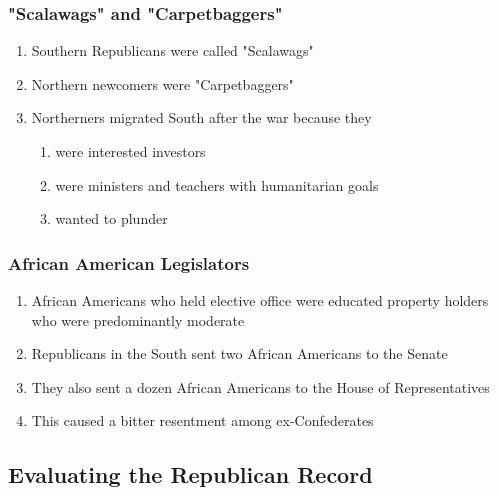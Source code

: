 \documentclass[12pt]{article} %
\begin{document}
\subsubsection{"Scalawags" and "Carpetbaggers"}
\begin{enumerate}
	\item Southern Republicans were called "Scalawags"
	\item Northern newcomers were "Carpetbaggers"
	\item Northerners migrated South after the war because they
	\begin{enumerate}
		\item were interested investors
		\item were ministers and teachers with humanitarian goals
		\item wanted to plunder
	\end{enumerate}
\end{enumerate}

\subsubsection{African American Legislators}
\begin{enumerate}
	\item African Americans who held elective office were educated property holders who were 
		predominantly moderate
	\item Republicans in the South sent two African Americans to the Senate
	\item They also sent a dozen African Americans to the House of Representatives
	\item This caused a bitter resentment among ex-Confederates
\end{enumerate}

\subsection{Evaluating the Republican Record}
\end{document}
